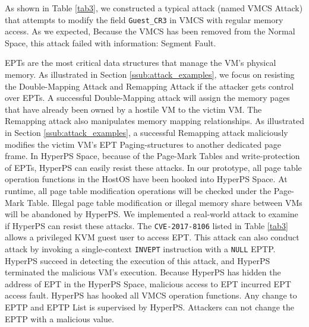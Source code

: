 As shown in Table \ref{tab3}, we constructed a typical attack (named VMCS Attack) that attempts to modify the field \verb|Guest_CR3| in VMCS with regular memory access. 
As we expected, Because the VMCS has been removed from the Normal Space, this attack failed with information: Segment Fault. 

EPTs are the most critical data structures that manage the VM's physical memory.
As illustrated in Section \ref{ssub:attack_examples}, we focus on resisting the Double-Mapping Attack and Remapping Attack if the attacker gets control over EPTs.
A successful Double-Mapping attack will assign the memory pages that have already been owned by a hostile VM to the victim VM. 
The Remapping attack also manipulates memory mapping relationships. As illustrated in Section \ref{ssub:attack_examples}, 
a successful Remapping attack maliciously modifies the victim VM's EPT Paging-structures to another dedicated page frame. 
In HyperPS Space, because of the Page-Mark Tables and write-protection of EPTs, HyperPS can easily resist these attacks. 
In our prototype, all page table operation functions in the HostOS have been hooked into HyperPS Space. At runtime, all page table modification operations will be checked under the Page-Mark Table. Illegal page table modification or illegal memory share between VMs will be abandoned by HyperPS. 
We implemented a real-world attack to examine if HyperPS can resist these attacks. 
The \verb|CVE-2017-8106| listed in Table \ref{tab3} allows a privileged KVM guest user to access EPT. 
This attack can also conduct attack by invoking a single-context \verb|INVEPT| instruction with a \verb|NULL| EPTP.
HyperPS succeed in detecting the execution of this attack, and HyperPS terminated the malicious VM's execution. 
Because HyperPS has hidden the address of EPT in the HyperPS Space, malicious access to EPT incurred EPT access fault. 
HyperPS has hooked all VMCS operation functions. Any change to EPTP and EPTP List is supervised by HyperPS. Attackers can not change the EPTP with a malicious value.


